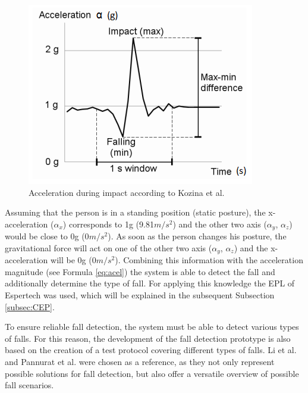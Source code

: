 \documentclass[10pt,journal,compsoc]{IEEEtran}
\begin{document}
\begin{figure}[!ht]
	\centering
	\includegraphics[scale=0.9]{Images/KozinaImpact}
	\caption[Acceleration during impact]{Acceleration during impact according to Kozina et al. ~\cite{Kozina}}
	\label{fig:fallKozina}
\end{figure}
 Assuming that the person is in a standing position (static posture), the x-acceleration ($\alpha_x$) corresponds to 1g (9.81$m/s^{2}$) and the other two axis ($\alpha_y$, $\alpha_z$) would be close to 0g (0$m/s^{2}$). As soon as the person changes his posture, the gravitational force will act on one of the other two axis ($\alpha_y$, $\alpha_z$) and the x-acceleration will be 0g (0$m/s^{2}$). Combining this information with the acceleration magnitude (see Formula \ref{eq:acel}) the system is able to detect the fall and additionally determine the type of fall. For applying this knowledge the EPL of Espertech \cite{Esper:2016} was used, which will be explained in the subsequent Subsection \ref{subsec:CEP}.

To ensure reliable fall detection, the system must be able to detect various types of falls. For this reason, the development of the fall detection prototype is also based on the creation of a test protocol covering different types of falls. Li et al. \cite{Li2009} and Pannurat et al. \cite{Pannurat2014} were chosen as a reference, as they not only represent possible solutions for fall detection, but also offer a versatile overview of possible fall scenarios.
\end{document}
